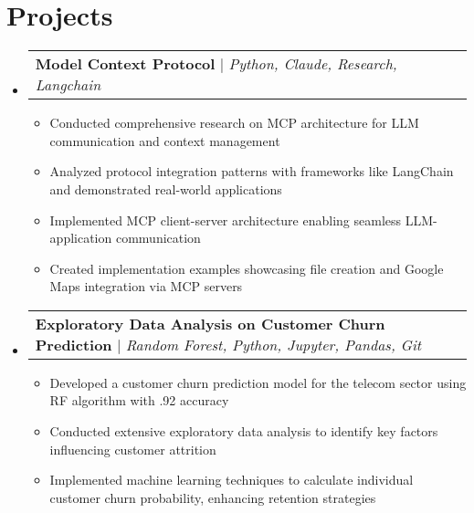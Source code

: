 \documentclass[letterpaper,11pt]{article}
\makeatletter
\newcommand{\resumeItem}[1]{
  \item\small{
    {#1 \vspace{-2pt}}
  }
}
\newcommand{\resumeProjectHeading}[2]{
    \item
    \begin{tabular*}{0.97\textwidth}{l@{\extracolsep{\fill}}r}
      \small#1 & #2 \\
    \end{tabular*}\vspace{-7pt}
}
\newcommand{\resumeSubHeadingListStart}{\begin{itemize}[leftmargin=0.15in, label={}]}
\newcommand{\resumeSubHeadingListEnd}{\end{itemize}}
\newcommand{\resumeItemListStart}{\begin{itemize}}
\newcommand{\resumeItemListEnd}{\end{itemize}\vspace{-5pt}}
\makeatother
\begin{document}
\section{Projects}
    \resumeSubHeadingListStart
      \resumeProjectHeading
          {\textbf{Model Context Protocol} $|$ \emph{Python, Claude, Research, Langchain}}{}
          \resumeItemListStart
            \resumeItem{Conducted comprehensive research on MCP architecture for LLM communication and context management}
            \resumeItem{Analyzed protocol integration patterns with frameworks like LangChain and demonstrated real-world applications}
            \resumeItem{Implemented MCP client-server architecture enabling seamless LLM-application communication}
            \resumeItem{Created implementation examples showcasing file creation and Google Maps integration via MCP servers}
          \resumeItemListEnd
      \resumeProjectHeading
          {\textbf{Exploratory Data Analysis on Customer Churn Prediction} $|$ \emph{Random Forest, Python, Jupyter, Pandas, Git}}{}
          \resumeItemListStart
            \resumeItem{Developed a customer churn prediction model for the telecom sector using RF algorithm with .92 accuracy}
            \resumeItem{Conducted extensive exploratory data analysis to identify key factors influencing customer attrition}
            \resumeItem{Implemented machine learning techniques to calculate individual customer churn probability, enhancing retention strategies}
          \resumeItemListEnd 
    \resumeSubHeadingListEnd





\end{document}
